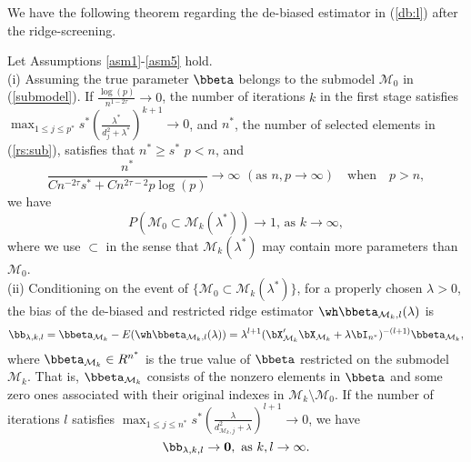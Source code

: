 We have the following theorem regarding the de-biased estimator in (\ref{db:l}) after the ridge-screening.
\begin{theorem}\label{thm5} Let Assumptions \ref{asm1}-\ref{asm5} hold.\\
    (i) Assuming the true parameter $\bbeta$ belongs to the submodel $\mathcal{M}_0$ in (\ref{submodel}). If $\frac{\log(p)}{n^{1-2\tau}}\rightarrow 0$, the number of iterations $k$ in the first stage satisfies $\max_{1\leq j\leq p^*}s^*(\frac{\lambda^*}{d_j^2+\lambda^*})^{k+1}\rightarrow 0$, and $n^*$, the number of selected elements in (\ref{rs:sub}),  satisfies that $n^*\geq s^*$   $p<n$, and
    \[\frac{n^*}{Cn^{-2\tau}s^*+Cn^{2\tau-2}p\log(p)}\rightarrow\infty\,\,(\text{as}\,\, n,p\rightarrow\infty)
    \quad\text{when}\quad p>n,\]
    we have
    \[P(\mathcal{M}_0\subset \mathcal{M}_{k}(\lambda^*))\rightarrow 1,\,\text{as $k\rightarrow\infty$},\]
    where we use $\subset$ in the sense that $\mathcal{M}_{k}(\lambda^*)$ may contain more parameters than $\mathcal{M}_0$.\\
    (ii) Conditioning on the event of $\{\mathcal{M}_0\subset \mathcal{M}_{k}(\lambda^*)\}$, for a properly chosen $\lambda>0$, the bias of the de-biased and restricted ridge estimator $\wh\bbeta_{\mathcal{M}_k,l}(\lambda)$ is 
    \begin{equation}\label{bc:kl}
         \bb_{\lambda,k,l}=\bbeta_{\mathcal{M}_k}-E(\wh\bbeta_{\mathcal{M}_k,l}(\lambda))=\lambda^{l+1}(\bX_{\mathcal{M}_k}'\bX_{\mathcal{M}_k}+\lambda\bI_{n^*})^{-(l+1)}\bbeta_{\mathcal{M}_k},
    \end{equation}
     where $\bbeta_{\mathcal{M}_k}\in R^{n^*}$ is the true value of $\bbeta$ restricted on the submodel $\mathcal{M}_k$. That is,  $\bbeta_{\mathcal{M}_k}$ consists of the nonzero elements in $\bbeta$ and some zero ones associated with their original indexes in $\mathcal{M}_k\setminus \mathcal{M}_0$.
    If the number of iterations $l$ satisfies $\max_{1\leq j\leq n^*}s^*(\frac{\lambda}{d_{\mathcal{M}_k,j}^2+\lambda})^{l+1}\rightarrow 0$, we have
     \[\bb_{\lambda,k,l}\rightarrow {\bf 0},\,\, \text{as}\,\, k,l\rightarrow\infty.\]
\end{theorem}
